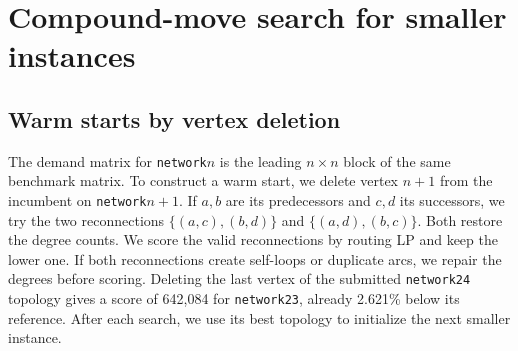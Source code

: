 \documentclass[a4paper]{article}
\begin{document}




\clearpage
\section{Compound-move search for smaller instances}

\subsection{Warm starts by vertex deletion}

The demand matrix for \texttt{network}\(n\) is the leading \(n\times n\) block of the same benchmark matrix.
To construct a warm start, we delete vertex \(n+1\) from the incumbent on \texttt{network}\(n+1\).
If \(a,b\) are its predecessors and \(c,d\) its successors, we try the two reconnections
\(\{(a,c),(b,d)\}\) and \(\{(a,d),(b,c)\}\). Both restore the degree counts.
We score the valid reconnections by routing LP and keep the lower one. If both reconnections create self-loops
or duplicate arcs, we repair the degrees before scoring.
Deleting the last vertex of the submitted \texttt{network24} topology gives a score of 642,084 for \texttt{network23},
already 2.621\% below its reference. After each search, we use its best topology to initialize the next smaller instance.
\end{document}
